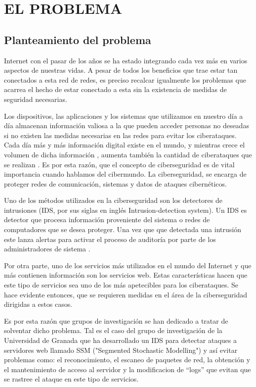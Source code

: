 \chapter{EL PROBLEMA}
\label{capitulo1}

\section{Planteamiento del problema}

Internet con el pasar de los años se ha estado integrando cada vez más en varios aspectos de nuestras vidas. A pesar de todos los beneficios que trae estar tan conectados a esta red de redes, es preciso recalcar igualmente los problemas que acarrea el hecho de estar conectado a esta sin la existencia de medidas de seguridad necesarias. 

Los dispositivos, las aplicaciones y los sistemas que utilizamos en nuestro día a día almacenan información valiosa a la que pueden acceder personas no deseadas si no existen las medidas necesarias en las redes para evitar los ciberataques. Cada día más y más información digital existe en el mundo, y mientras crece el volumen de dicha información , aumenta también la cantidad de ciberataques que se realizan \cite{pwc}. Es por esta razón, que el concepto de ciberseguridad es de vital importancia cuando hablamos del cibermundo.  La ciberseguridad, se encarga de proteger redes de comunicación, sistemas y datos de ataques cibernéticos. 

Uno de los métodos utilizados en la ciberseguridad son los detectores de intrusiones (IDS, por sus siglas en inglés Intrusion-detection system). Un IDS es detector que procesa información proveniente del sistema o redes de computadores que se desea proteger. Una vez que que detectada una intrusión este lanza alertas para activar el proceso de auditoría por parte de los administradores de sistema \cite{IDS}. 

Por otra parte, uno de los servicios más utilizados en el mundo del Internet y que más contienen información son los servicios web. Estas características hacen que este tipo de servicios sea uno de los más apetecibles para los ciberataques. Se hace evidente entonces, que se requieren medidas en el área de la ciberseguridad dirigidas a estos casos.

Es por esta razón que grupos de investigación se han dedicado a tratar de solventar dicho problema. Tal es el caso del grupo de investigación de la Universidad de Granada que  ha desarrollado un IDS para detectar ataques a servidores web llamado SSM ("Segmented Stochastic Modelling") y así evitar problemas como: el reconocimiento, el escaneo de paquetes de red, la obtención y el mantenimiento de acceso al servidor y la modificacion de ``logs'' que evitan que se rastree el ataque en este tipo de servicios.

